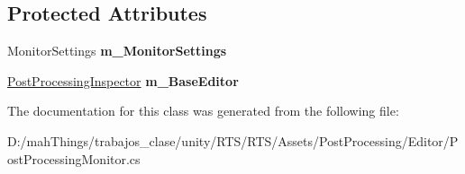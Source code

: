 \subsection*{Protected Attributes}
\begin{DoxyCompactItemize}
\item 
\mbox{\label{class_unity_editor_1_1_post_processing_1_1_post_processing_monitor_aafb8128cac56dbe0e784e1f55f8525a9}} 
Monitor\+Settings {\bfseries m\+\_\+\+Monitor\+Settings}
\item 
\mbox{\label{class_unity_editor_1_1_post_processing_1_1_post_processing_monitor_a2553b93b6efa7231ed205cc06d6495f8}} 
\mbox{\hyperlink{class_unity_editor_1_1_post_processing_1_1_post_processing_inspector}{Post\+Processing\+Inspector}} {\bfseries m\+\_\+\+Base\+Editor}
\end{DoxyCompactItemize}


The documentation for this class was generated from the following file\+:\begin{DoxyCompactItemize}
\item 
D\+:/mah\+Things/trabajos\+\_\+clase/unity/\+R\+T\+S/\+R\+T\+S/\+Assets/\+Post\+Processing/\+Editor/Post\+Processing\+Monitor.\+cs\end{DoxyCompactItemize}
